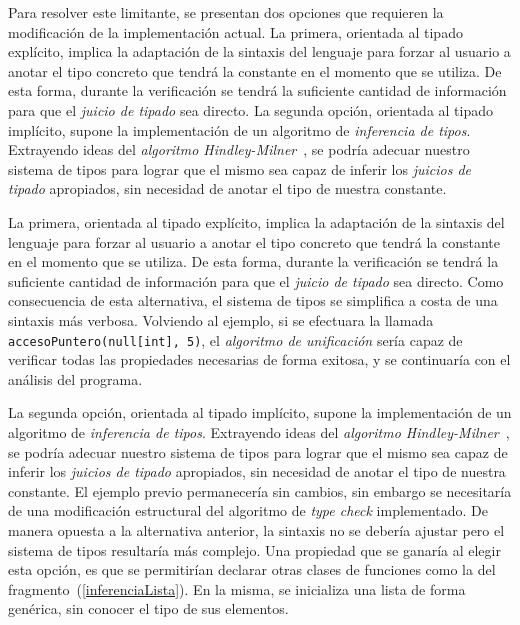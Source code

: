 Para resolver este limitante, se presentan dos opciones que requieren la modificación de la implementación actual.
La primera, orientada al tipado explícito, implica la adaptación de la sintaxis del lenguaje para forzar al usuario a anotar el tipo concreto que tendrá la constante en el momento que se utiliza.
De esta forma, durante la verificación se tendrá la suficiente cantidad de información para que el \textit{juicio de tipado} sea directo.
La segunda opción, orientada al tipado implícito, supone la implementación de un algoritmo de \textit{inferencia de tipos}.
Extrayendo ideas del \textit{algoritmo Hindley-Milner}~\cite{Inferencia}, se podría adecuar nuestro sistema de tipos para lograr que el mismo sea capaz de inferir los \textit{juicios de tipado} apropiados, sin necesidad de anotar el tipo de nuestra constante.

\iffalse
La primera, orientada al tipado explícito, implica la adaptación de la sintaxis del lenguaje para forzar al usuario a anotar el tipo concreto que tendrá la constante en el momento que se utiliza.
De esta forma, durante la verificación se tendrá la suficiente cantidad de información para que el \textit{juicio de tipado} sea directo.
Como consecuencia de esta alternativa, el sistema de tipos se simplifica a costa de una sintaxis más verbosa.
Volviendo al ejemplo, si se efectuara la llamada \lstinline[style = lang]{accesoPuntero(null[int], 5)}, el \textit{algoritmo de unificación} sería capaz de verificar todas las propiedades necesarias de forma exitosa, y se continuaría con el análisis del programa.

La segunda opción, orientada al tipado implícito, supone la implementación de un algoritmo de \textit{inferencia de tipos}.
Extrayendo ideas del \textit{algoritmo Hindley-Milner}~\cite{Inferencia}, se podría adecuar nuestro sistema de tipos para lograr que el mismo sea capaz de inferir los \textit{juicios de tipado} apropiados, sin necesidad de anotar el tipo de nuestra constante.
El ejemplo previo permanecería sin cambios, sin embargo se necesitaría de una modificación estructural del algoritmo de \textit{type check} implementado.
De manera opuesta a la alternativa anterior, la sintaxis no se debería ajustar pero el sistema de tipos resultaría más complejo.
Una propiedad que se ganaría al elegir esta opción, es que se permitirían declarar otras clases de funciones como la del fragmento~(\ref{inferenciaLista}).
En la misma, se inicializa una lista de forma genérica, sin conocer el tipo de sus elementos.

